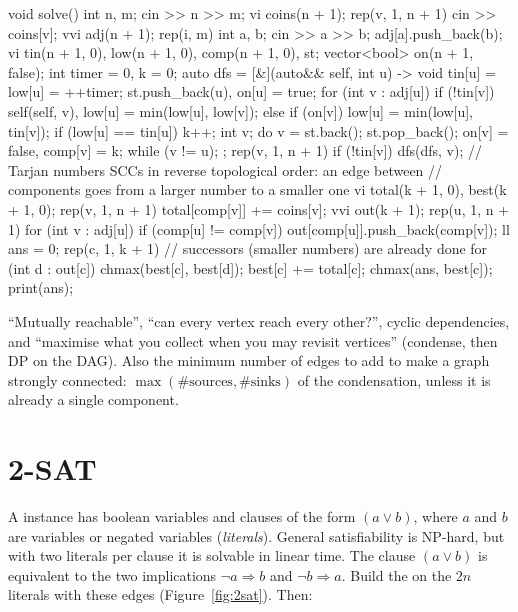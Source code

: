 \begin{code}
void solve() {
    int n, m;
    cin >> n >> m;
    vi coins(n + 1);
    rep(v, 1, n + 1) cin >> coins[v];
    vvi adj(n + 1);
    rep(i, m) {
        int a, b;
        cin >> a >> b;
        adj[a].push_back(b);
    }
    vi tin(n + 1, 0), low(n + 1, 0), comp(n + 1, 0), st;
    vector<bool> on(n + 1, false);
    int timer = 0, k = 0;
    auto dfs = [&](auto&& self, int u) -> void {
        tin[u] = low[u] = ++timer;
        st.push_back(u), on[u] = true;
        for (int v : adj[u]) {
            if (!tin[v]) self(self, v), low[u] = min(low[u], low[v]);
            else if (on[v]) low[u] = min(low[u], tin[v]);
        }
        if (low[u] == tin[u]) {
            k++;
            int v;
            do {
                v = st.back();
                st.pop_back();
                on[v] = false, comp[v] = k;
            } while (v != u);
        }
    };
    rep(v, 1, n + 1) if (!tin[v]) dfs(dfs, v);
    // Tarjan numbers SCCs in reverse topological order: an edge between
    // components goes from a larger number to a smaller one
    vi total(k + 1, 0), best(k + 1, 0);
    rep(v, 1, n + 1) total[comp[v]] += coins[v];
    vvi out(k + 1);
    rep(u, 1, n + 1) for (int v : adj[u])
        if (comp[u] != comp[v]) out[comp[u]].push_back(comp[v]);
    ll ans = 0;
    rep(c, 1, k + 1) {  // successors (smaller numbers) are already done
        for (int d : out[c]) chmax(best[c], best[d]);
        best[c] += total[c];
        chmax(ans, best[c]);
    }
    print(ans);
}
\end{code}

\begin{recognize}
``Mutually reachable'', ``can every vertex reach every other?'', cyclic dependencies, and ``maximise what you collect when you may
revisit vertices'' (condense, then DP on the DAG). Also the minimum number of edges to add to make a graph strongly connected:
$\max(\#\text{sources}, \#\text{sinks})$ of the condensation, unless it is already a single component.
\end{recognize}

\section[2-SAT]{2-SAT \hfill \plat}\label{sec:2sat}

A  instance has boolean variables and clauses of the form $(a \lor b)$, where $a$ and $b$ are variables or negated
variables (\emph{literals}). General satisfiability is NP-hard, but with two literals per clause it is solvable in linear time.
The clause $(a \lor b)$ is equivalent to the two implications $\lnot a \Rightarrow b$ and $\lnot b \Rightarrow a$. Build the
 on the $2n$ literals with these edges (Figure~\ref{fig:2sat}). Then:

